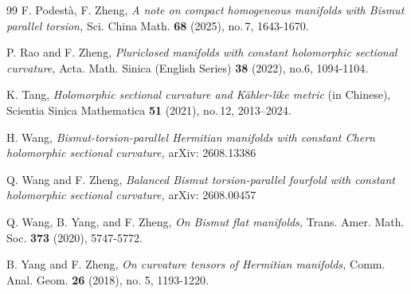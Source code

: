 \documentclass{amsart}
\begin{document}
\begin{thebibliography}{99}
 F. Podest\`a, F. Zheng, \emph{A note on compact homogeneous manifolds with Bismut parallel torsion,} Sci. China Math. {\bf 68} (2025), no.\,7, 1643-1670.


 P. Rao and F. Zheng, \emph{ Pluriclosed manifolds with constant holomorphic sectional curvature,} Acta. Math. Sinica (English Series) {\bf 38} (2022), no.6, 1094-1104.






  K. Tang, \emph{Holomorphic sectional curvature and K\"ahler-like metric} (in Chinese),  {Scientia Sinica Mathematica {\bf 51} (2021), no.\,12, 2013--2024.}



 H. Wang, \emph{Bismut-torsion-parallel Hermitian manifolds with constant Chern holomorphic sectional curvature,}   arXiv: 2608.13386


 Q. Wang and F. Zheng, \emph{Balanced Bismut torsion-parallel fourfold with constant holomorphic sectional curvature,}   arXiv: 2608.00457



 Q. Wang, B. Yang, and F. Zheng, \emph{On Bismut flat manifolds,} Trans. Amer. Math. Soc. {\bf 373} (2020), 5747-5772.

 B. Yang and F. Zheng, \emph{On curvature tensors of Hermitian manifolds,} Comm. Anal. Geom. {\bf 26} (2018), no. 5, 1193-1220.







\end{thebibliography}
\end{document}
